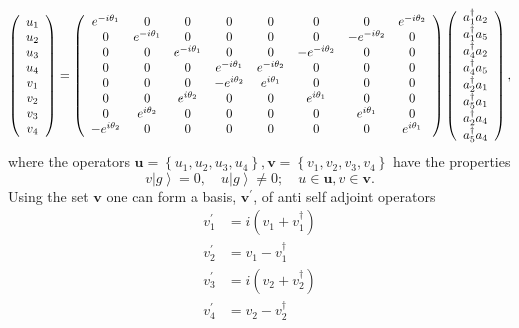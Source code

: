 \documentclass[aps,preprint]{revtex4}%
\begin{document}
\begin{equation}
\left(
\begin{array}
[c]{c}%
u_{1}\\
u_{2}\\
u_{3}\\
u_{4}\\
v_{1}\\
v_{2}\\
v_{3}\\
v_{4}%
\end{array}
\right)  =\left(
\begin{array}
[c]{cccccccc}%
e^{-i\theta_{1}} & 0 & 0 & 0 & 0 & 0 & 0 & e^{-i\theta_{2}}\\
0 & e^{-i\theta_{1}} & 0 & 0 & 0 & 0 & -e^{-i\theta_{2}} & 0\\
0 & 0 & e^{-i\theta_{1}} & 0 & 0 & -e^{-i\theta_{2}} & 0 & 0\\
0 & 0 & 0 & e^{-i\theta_{1}} & e^{-i\theta_{2}} & 0 & 0 & 0\\
0 & 0 & 0 & -e^{i\theta_{2}} & e^{i\theta_{1}} & 0 & 0 & 0\\
0 & 0 & e^{i\theta_{2}} & 0 & 0 & e^{i\theta_{1}} & 0 & 0\\
0 & e^{i\theta_{2}} & 0 & 0 & 0 & 0 & e^{i\theta_{1}} & 0\\
-e^{i\theta_{2}} & 0 & 0 & 0 & 0 & 0 & 0 & e^{i\theta_{1}}%
\end{array}
\right)  \left(
\begin{array}
[c]{c}%
a_{1}^{\dagger}a_{2}\\
a_{1}^{\dagger}a_{5}\\
a_{4}^{\dagger}a_{2}\\
a_{4}^{\dagger}a_{5}\\
a_{2}^{\dagger}a_{1}\\
a_{5}^{\dagger}a_{1}\\
a_{2}^{\dagger}a_{4}\\
a_{5}^{\dagger}a_{4}%
\end{array}
\right)  ,
\end{equation}
where the operators $\boldsymbol{u}=\left\{  u_{1},u_{2},u_{3},u_{4}\right\}
,\boldsymbol{v}=\left\{  v_{1},v_{2},v_{3},v_{4}\right\}  $ have the
properties
\begin{equation}
v\left\vert g\right\rangle =0,\quad u\left\vert g\right\rangle \neq0;\quad
u\in\boldsymbol{u},v\in\boldsymbol{v.}%
\end{equation}
Using the set $\boldsymbol{v}$ one can form a basis, $\boldsymbol{v}^{\prime}%
$, of anti self adjoint operators
\begin{align}
v_{1}^{\prime}  &  =i\left(  v_{1}+v_{1}^{\dagger}\right) \nonumber\\
v_{2}^{\prime}  &  =v_{1}-v_{1}^{\dagger}\nonumber\\
v_{3}^{\prime}  &  =i\left(  v_{2}+v_{2}^{\dagger}\right) \nonumber\\
v_{4}^{\prime}  &  =v_{2}-v_{2}^{\dagger}%
\end{align}
\end{document}

